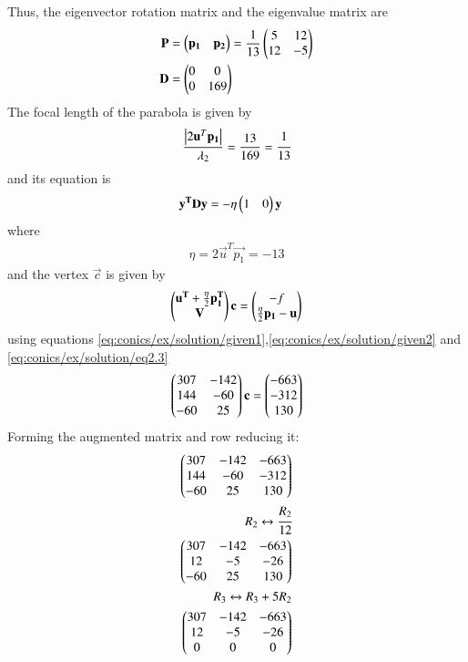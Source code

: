 \begin{enumerate}
%
Thus, the eigenvector rotation matrix and the eigenvalue matrix are
\begin{align}
\mathbf{P}&=\begin{pmatrix}\mathbf{p_1}&\mathbf{p_2}\end{pmatrix}=\frac{1}{13}\begin{pmatrix}5&12\\ 12 &-5\end{pmatrix} \\
\mathbf{D}&=\begin{pmatrix}0&0\\0&169\end{pmatrix}
\end{align}
The focal length of the parabola is given by 
\begin{align}
\frac{\left\vert2\mathbf{u}^T\mathbf{p_1}\right\vert}{\lambda_2}
    = \frac{13}{169}=\cfrac{1}{13}
\end{align}
and its equation is
\begin{align}
    \mathbf{y^T}\mathbf{D}\mathbf{y}&=-\eta\begin{pmatrix}1&0\end{pmatrix}\mathbf{y}\label{eq:conics/ex/solution/eq2.4}
\end{align}
where
\begin{align}
    \eta=2\vec{u}^T\vec{p_1}=-13
\end{align}
and the vertex $\vec{c}$ is given by 
\begin{align}
    \begin{pmatrix}\mathbf{u^T}+\frac{\eta}{2}\mathbf{p_1^T} \\ \mathbf{V}\end{pmatrix}\mathbf{c}=
    \begin{pmatrix}-f \\\frac{\eta}{2}\mathbf{p_1}-\mathbf{u}\end{pmatrix} 
\end{align}
using equations \eqref{eq:conics/ex/solution/given1},\eqref{eq:conics/ex/solution/given2} and \eqref{eq:conics/ex/solution/eq2.3}
\begin{align}
    \begin{pmatrix}307& -142 \\ 144 & -60 \\  -60 & 25 \end{pmatrix}\mathbf{c}=\begin{pmatrix}-663 \\ -312\\ 130\end{pmatrix} \label{eq:conics/ex/solution/eqcen}
\end{align}
Forming the augmented matrix and row reducing it:
\begin{align}
\myvec{307 & -142 & -663\\144 & -60 & -312 \\-60 & 25 &130 }\\
R_2\leftrightarrow \cfrac{R_2}{12} \nonumber \\
\myvec{307 & -142 & -663\\12 & -5 & -26 \\-60 & 25 &130}\\
R_3\leftrightarrow R_3+5R_2 \nonumber \\
\myvec{307 & -142 & -663\\12 & -5 & -26 \\0 & 0 &0}\\

\end{align}
\end{enumerate}
